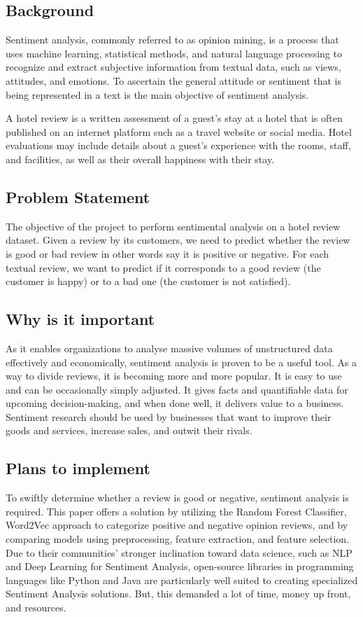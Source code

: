 \subsection{Background}
Sentiment analysis, commonly referred to as opinion mining, is a process that uses machine learning, statistical methods, and natural language processing to recognize and extract subjective information from textual data, such as views, attitudes, and emotions. To ascertain the general attitude or sentiment that is being represented in a text is the main objective of sentiment analysis.

A hotel review is a written assessment of a guest's stay at a hotel that is often published on an internet platform such as a travel website or social media. Hotel evaluations may include details about a guest's experience with the rooms, staff, and facilities, as well as their overall happiness with their stay.
\subsection{ Problem Statement}
The objective of the project to perform sentimental analysis on a hotel review dataset. Given a review by its customers, we need to predict whether the review is good or bad review in other words say it is positive or negative.
For each textual review, we want to predict if it corresponds to a good review (the customer is happy) or to a bad one (the customer is not satisfied).
\subsection{Why is it important}
As it enables organizations to analyse massive volumes of unstructured data effectively and economically, sentiment analysis is proven to be a useful tool. As a way to divide reviews, it is becoming more and more popular. It is easy to use and can be occasionally simply adjusted. It gives facts and quantifiable data for upcoming decision-making, and when done well, it delivers value to a business. Sentiment research should be used by businesses that want to improve their goods and services, increase sales, and outwit their rivals.

\subsection{Plans to implement}
To swiftly determine whether a review is good or negative, sentiment analysis is required. This paper offers a solution by utilizing the Random Forest Classifier, Word2Vec approach to categorize positive and negative opinion reviews, and by comparing models using preprocessing, feature extraction, and feature selection. Due to their communities' stronger inclination toward data science, such as NLP and Deep Learning for Sentiment Analysis, open-source libraries in programming languages like Python and Java are particularly well suited to creating specialized Sentiment Analysis solutions. But, this demanded a lot of time, money up front, and resources.

